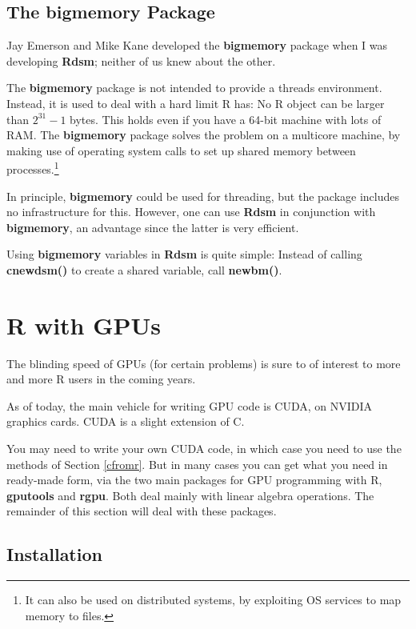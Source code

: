 \subsection{The bigmemory Package}
\label{bigmemory}

Jay Emerson and Mike Kane developed the {\bf bigmemory} package when I
was developing {\bf Rdsm}; neither of us knew about the other.

The {\bf bigmemory} package is not intended to provide a threads
environment.  Instead, it is used to deal with a hard limit R has:
No R object can be larger than $2^{31}-1$ bytes.  This holds even if you
have a 64-bit machine with lots of RAM.  The {\bf bigmemory} package
solves the problem on a multicore machine, by making use of operating
system calls to set up shared memory between processes.\footnote{It can
also be used on distributed systems, by exploiting OS services to map
memory to files.}

In principle, {\bf bigmemory} could be used for threading, but the
package includes no infrastructure for this.  However, one can use {\bf
Rdsm} in conjunction with {\bf bigmemory}, an advantage since the latter
is very efficient.

Using {\bf bigmemory} variables in {\bf Rdsm} is quite simple:  Instead
of calling {\bf cnewdsm()} to create a shared variable, call {\bf newbm()}.

\section{R with GPUs}

The blinding speed of GPUs (for certain problems) is sure to of interest
to more and more R users in the coming years.

As of today, the main vehicle for writing GPU code is CUDA, on NVIDIA
graphics cards.  CUDA is a slight extension of C.

You may need to write your own CUDA code, in which case you need to use
the methods of Section \ref{cfromr}.  But in many cases you can get what
you need in ready-made form, via the two main packages for GPU programming
with R, {\bf gputools} and {\bf rgpu}.  Both deal mainly with linear
algebra operations.  The remainder of this section will deal with these
packages.

\subsection{Installation}
\label{gpuinstall}

